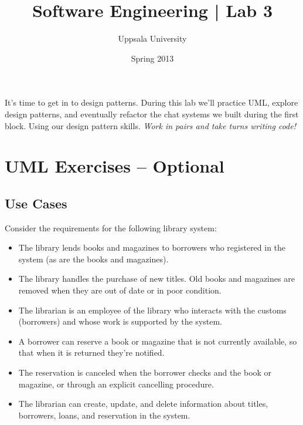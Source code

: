 \documentclass{article}
\begin{document}
  \title{ Software Engineering | Lab 3 }
  \author{ Uppsala University }
  \date{ Spring 2013 }
  \maketitle

  \lstset{language=[Sharp]C}

  \section*{}
    It's time to get in to design patterns. During this lab we'll practice UML, explore design patterns, and eventually refactor the chat systems we built during the first block. Using our design pattern skills. \emph{Work in pairs and take turns writing code!}


\section{UML Exercises -- Optional}

  \subsection{Use Cases}

  Consider the requirements for the following library system:

  \begin{itemize}
  \item The library lends books and magazines to borrowers who registered in the system (as are the books and magazines).
  \item The library handles the purchase of new titles. Old books and magazines are removed when they are out of date or in poor condition.
  \item The librarian is an employee of the library who interacts with the customs (borrowers) and whose work is supported by the system.
  \item A borrower can reserve a book or magazine that is not currently available, so that when it is returned they're notified.
  \item The reservation is canceled when the borrower checks and the book or magazine, or through an explicit cancelling procedure.
  \item The librarian can create, update, and delete information about titles, borrowers, loans, and reservation in the system.
  \end{itemize}
\end{document}
